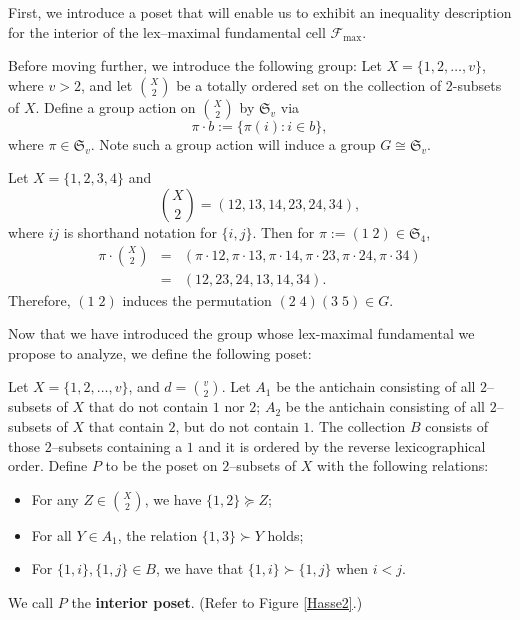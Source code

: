 First, we introduce a poset that will enable us to exhibit an inequality description for the interior of the lex--maximal fundamental cell $\mathcal{F}_{\max}$. 

Before moving further, we introduce the following group: Let \(X = \{1, 2, \dots, v\}\), where \(v > 2\), and let \(\binom{X}{2}\) be a totally ordered set on the collection of 2-subsets of \(X\). Define a group action on \(\binom{X}{2}\) by \(\mathfrak{S}_v\) via \[\pi \cdot b := \{\pi(i) : i \in b\},\] where \(\pi \in \mathfrak{S}_v\). Note such a group action will induce a group \(G \cong \mathfrak{S}_v\). 

\begin{example}
Let \(X = \{1, 2, 3, 4\}\) and 
\[
\binom{X}{2} = \left(12, 13, 14, 23, 24, 34\right),
\]
where \(ij\) is shorthand notation for \(\{i,j\}\). Then for \(\pi := (1\;2) \in \mathfrak{S}_4\),
\begin{eqnarray*}
\pi \cdot \binom{X}{2} &= &\left(\pi\cdot12, \pi\cdot13, \pi\cdot14, \pi\cdot23, \pi\cdot24, \pi\cdot34\right)\\
&= &\left(12, 23, 24, 13, 14, 34\right).
\end{eqnarray*}
Therefore, \((1\;2)\) induces the permutation \((2\;4)(3\;5) \in G\).
\end{example}

Now that we have introduced the group whose lex-maximal fundamental we propose to analyze, we define the following poset:

\begin{defn}\label{interiorPoset}
Let $X = \{1, 2, \dots , v\}$, and $d = \binom{v}{2}$. Let $A_1$ be the antichain consisting of all $2$--subsets of $X$ that do not contain $1$ nor $2$; $A_2$ be the antichain consisting of all $2$--subsets of $X$ that contain $2$, but do not contain $1$. The collection $B$ consists of those $2$--subsets containing a $1$ and it is ordered by the reverse lexicographical order. Define $P$ to be the poset on $2$--subsets of $X$ with the following relations:

\begin{itemize}
\item For any $Z \in \binom{X}{2}$, we have $\{1,2\} \succeq Z$;
\item For all $Y \in A_1$, the relation $\{1,3\} \succ Y$ holds;
\item For $\{1,i\}, \{1,j\} \in B$, we have that $\{1,i\} \succ \{1,j\}$ when $i < j$.
\end{itemize}

We call $P$ the \textbf{interior poset}. (Refer to Figure \ref{Hasse2}.)
\end{defn}

